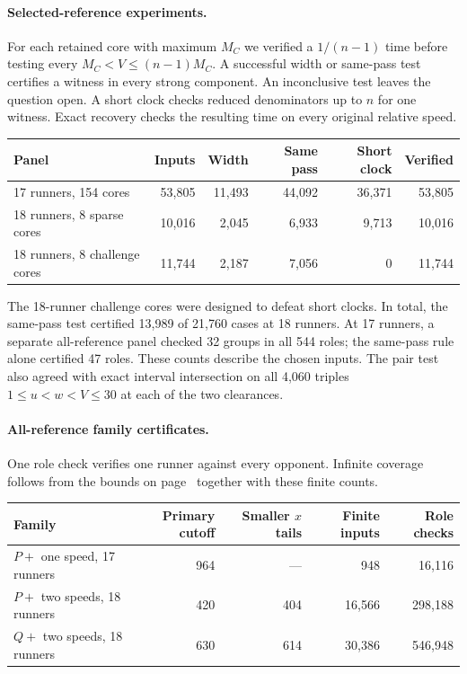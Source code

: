 \documentclass[11pt,letterpaper]{article}
\begin{document}
\paragraph{Selected-reference experiments.}
For each retained core with maximum \(M_C\) we verified a \(1/(n-1)\) time before testing every \(M_C<V\le(n-1)M_C\). A successful width or same-pass test certifies a witness in every strong component. An inconclusive test leaves the question open. A short clock checks reduced denominators up to \(n\) for one witness. Exact recovery checks the resulting time on every original relative speed.
\begin{center}\small
\begin{tabular}{lrrrrr}\toprule
Panel & Inputs & Width & Same pass & Short clock & Verified\\\midrule
17 runners, 154 cores & 53,805 & 11,493 & 44,092 & 36,371 & 53,805\\
18 runners, 8 sparse cores & 10,016 & 2,045 & 6,933 & 9,713 & 10,016\\
18 runners, 8 challenge cores & 11,744 & 2,187 & 7,056 & 0 & 11,744\\\bottomrule
\end{tabular}
\end{center}
The 18-runner challenge cores were designed to defeat short clocks. In total, the same-pass test certified 13,989 of 21,760 cases at 18 runners. At 17 runners, a separate all-reference panel checked 32 groups in all 544 roles; the same-pass rule alone certified 47 roles. These counts describe the chosen inputs. The pair test also agreed with exact interval intersection on all 4,060 triples \(1\le u<w<V\le30\) at each of the two clearances.

\paragraph{All-reference family certificates.}
One role check verifies one runner against every opponent. Infinite coverage follows from the bounds on page~\pageref{sec:cert} together with these finite counts.
\begin{center}\small
\begin{tabular}{lrrrr}\toprule
Family & Primary cutoff & Smaller \(x\) tails & Finite inputs & Role checks\\\midrule
\(P+\) one speed, 17 runners & 964 & --- & 948 & 16,116\\
\(P+\) two speeds, 18 runners & 420 & 404 & 16,566 & 298,188\\
\(Q+\) two speeds, 18 runners & 630 & 614 & 30,386 & 546,948\\\bottomrule
\end{tabular}
\end{center}
\end{document}
